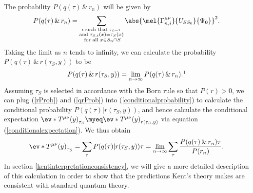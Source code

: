 \documentclass[12pt]{report}
\begin{document}
The probability $P(q(\tau) \, \&\,  r_n)$ will be given by
\begin{equation}\label{qrnProb}P(q(\tau) \, \&\,  r_n) =\sum_{\substack{i \text{ such that } \tau_{i}=\tau \\ \text{and }\tau_{S,i}(x)=\tau_S(x)\\ \text{ for all }x\in S_n\cap S }}\abs{\mel{\Gamma_{n,i}^{\mu\nu}}{U_{SS_0}}{\Psi_0}}^2.
\end{equation}
Taking the limit as $n$ tends to infinity, we can calculate the probability $P(q(\tau) \, \&\,  r(\tau_S,y))$ to be
\begin{equation}\label{qrProb}
P(q(\tau) \, \&\,  r(\tau_S,y))=\lim_{n\rightarrow\infty}P(q(\tau) \, \&\,  r_n).\protect\footnotemark
\end{equation}Assuming $\tau_S$ is selected in accordance with the Born rule so that $P(r)>0$, we can plug (\ref{rProb}) and (\ref{qrProb}) into (\ref{conditionalprobability}) to calculate the conditional probability $P(q(\tau) | r(\tau_S,y))$,  and hence calculate the conditional expectation  $\ev*{T^{\mu\nu}(y)}_{\tau_S}\myeq \ev*{T^{\mu\nu}(y)}_{r(\tau_S,y)}$ via equation (\ref{conditionalexpectation}). We thus obtain
\begin{equation}\label{beable1}
  \ev*{T^{\mu\nu}(y)}_{\tau_S}=\sum_\tau P(q(\tau) | r(\tau_S,y))\tau=\lim_{n\rightarrow\infty}\sum_\tau\frac{P(q(\tau) \, \& \, r_n)\tau}{P(r_n)}.
  \end{equation} 
In section \ref{kentinterpretationconsistency}, we will give a more detailed description of this calculation in order to show that the predictions Kent's theory makes are consistent with standard quantum theory.
 
\end{document}
